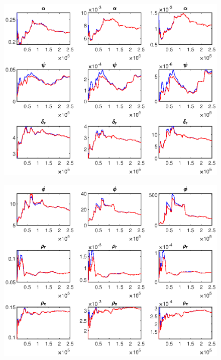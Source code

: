 \documentclass[11pt,preprint, authoryear]{elsarticle}
\let\origfigure\figure
\let\endorigfigure\endfigure
\renewenvironment{figure}[1][2] {
    \expandafter\origfigure\expandafter[H]
} {
    \endorigfigure
}
\numberwithin{equation}{section}
\numberwithin{figure}{section}
\numberwithin{table}{section}
\begin{document}
\begin{figure}
\begin{subfigure}[H]{0.49\textwidth}
         \includegraphics[width=\textwidth]{code/mcmc_u3}
     \end{subfigure}
    \begin{subfigure}[H]{0.49\textwidth}
         \centering
         \includegraphics[width=\textwidth]{code/mcmc_u4}
     \end{subfigure}
    \begin{subfigure}[H]{0.49\textwidth}
         \centering

\end{subfigure}
\end{figure}
\end{document}

